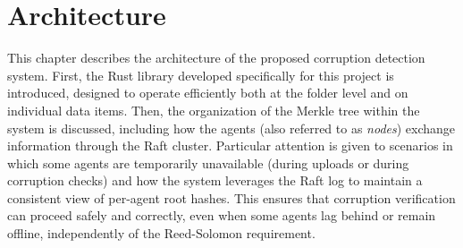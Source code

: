 \chapter{Architecture}

 This chapter describes the architecture of the proposed corruption detection system. First, the Rust library developed specifically for this project is introduced, designed to operate efficiently both at the folder level and on individual data items. Then, the organization of the Merkle tree within the system is discussed, including how the agents (also referred to as \textit{nodes}) exchange information through the Raft cluster. Particular attention is given to scenarios in which some agents are temporarily unavailable (during uploads or during corruption checks) and how the system leverages the Raft log to maintain a consistent view of per-agent root hashes. This ensures that corruption verification can proceed safely and correctly, even when some agents lag behind or remain offline, independently of the Reed-Solomon requirement.



